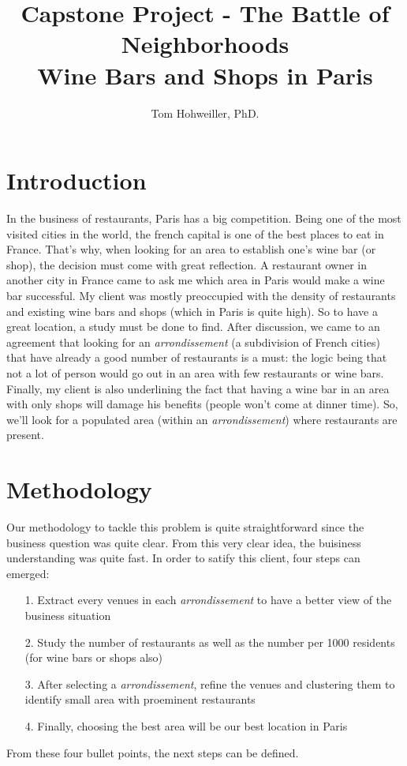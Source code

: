 \documentclass[english]{article}
\title{Capstone Project - The Battle of Neighborhoods \\ Wine Bars and Shops in Paris}
\author{Tom Hohweiller, PhD.}
\date{}
\begin{document}
	
	\maketitle
	\section{Introduction}
	In the business of restaurants, Paris has a big competition. Being one of the most visited cities in the world, the french capital is one of the best places to eat in France. That's why, when looking for an area to establish one's wine bar (or shop), the decision must come with great reflection. A restaurant owner in another city in France came to ask me which area in Paris would make a wine bar successful. My client was mostly preoccupied with the density of restaurants and existing wine bars and shops (which in Paris is quite high). So to have a great location, a study must be done to find. After discussion, we came to an agreement that looking for an \textit{arrondissement} (a subdivision of French cities) that have already a good number of restaurants is a must: the logic being that not a lot of person would go out in an area with few restaurants or wine bars. Finally, my client is also underlining the fact that having a wine bar in an area with only shops will damage his benefits (people won't come at dinner time). So, we'll look for a populated area (within an \textit{arrondissement}) where restaurants are present.
	\section{Methodology}
	Our methodology to tackle this problem is quite straightforward since the business question was quite clear. From this very clear idea, the buisiness understanding was quite fast. In order to satify this client, four steps can emerged:
	\begin{itemize}
		\item[1.] Extract every venues in each \textit{arrondissement} to have a better view of the business situation
		\item[2.] Study the number of restaurants as well as the number per 1000 residents (for wine bars or shops also)
		\item[3.] After selecting a \textit{arrondissement}, refine the venues and clustering them to identify small area with proeminent restaurants
		\item[4.] Finally, choosing the best area will be our best location in Paris
	\end{itemize}
	From these four bullet points, the next steps can be defined.
\end{document}
